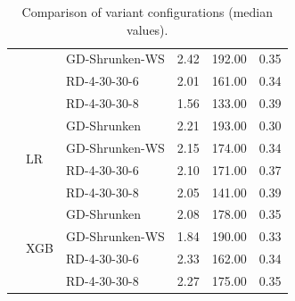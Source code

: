 \begin{table}[ht]
\begin{tabular}{lllrrr}
		                          &                       & GD-Shrunken-WS   & 2.42         & 192.00              & 0.35                    \\\cline{3-6}
		                          &                       & RD-4-30-30-6     & 2.01         & 161.00              & 0.34                    \\\cline{3-6}
		                          &                       & RD-4-30-30-8     & 1.56         & 133.00              & 0.39                    \\\cline{2-6}
		                          & \multirow{4}{*}{LR}   & GD-Shrunken      & 2.21         & 193.00              & 0.30                    \\\cline{3-6}
		                          &                       & GD-Shrunken-WS   & 2.15         & 174.00              & 0.34                    \\\cline{3-6}
		                          &                       & RD-4-30-30-6     & 2.10         & 171.00              & 0.37                    \\\cline{3-6}
		                          &                       & RD-4-30-30-8     & 2.05         & 141.00              & 0.39                    \\\cline{2-6}
		                          & \multirow{4}{*}{XGB}  & GD-Shrunken      & 2.08         & 178.00              & 0.35                    \\\cline{3-6}
		                          &                       & GD-Shrunken-WS   & 1.84         & 190.00              & 0.33                    \\\cline{3-6}
		                          &                       & RD-4-30-30-6     & 2.33         & 162.00              & 0.34                    \\\cline{3-6}
		                          &                       & RD-4-30-30-8     & 2.27         & 175.00              & 0.35                    \\
		\bottomrule
	\end{tabular}
	\caption{Comparison of variant configurations (median values).}
\end{table}

\clearpage


